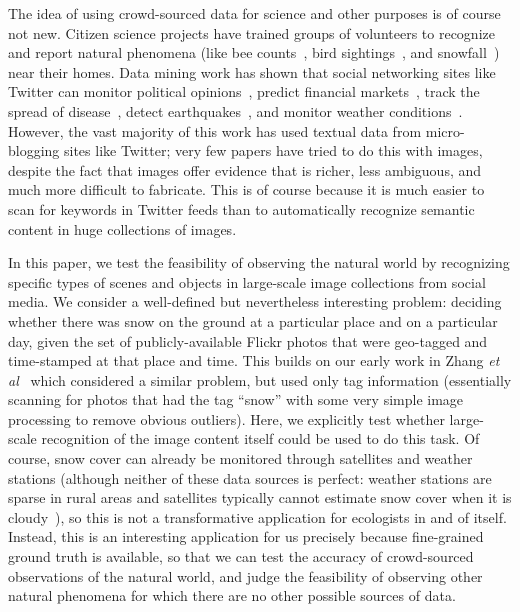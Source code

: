 The idea of using crowd-sourced data for science and other purposes is
of course not new. Citizen science projects have trained  groups
of volunteers to recognize and report natural phenomena (like bee
counts~\cite{greatsunflower}, bird sightings~\cite{ebirds}, and
snowfall~\cite{king09snowtweets}) near their homes.
Data mining work  has
shown that  social networking sites
like Twitter can 
monitor political opinions~\cite{jin10prediction,digrazia13},
predict financial markets~\cite{bollen11twitter}, track the spread of
disease~\cite{ginsberg09flu}, detect earthquakes~\cite{Sakaki:2010uv}, and monitor weather
conditions~\cite{meteo}. However, the vast majority of this work has
used textual data from micro-blogging sites like Twitter; very few papers have tried to do this with images, despite
the fact that images offer evidence that is richer, less ambiguous,
and much more difficult to fabricate. This is of course because it is
much easier to scan for keywords in Twitter feeds than to
automatically recognize semantic content in huge collections of
images. 



In this paper, we test the feasibility of observing the natural world
by recognizing specific types of scenes and objects in large-scale
image collections from social media.  We consider a well-defined but
nevertheless interesting problem: deciding whether there was snow on
the ground at a particular place and on a particular day, given the
set of publicly-available Flickr photos that were geo-tagged and
time-stamped at that place and time. This builds on our early work in
Zhang \textit{et al}~\cite{ecology2012www} which considered a similar
problem, but used only tag information (essentially scanning for
photos that had the tag ``snow'' with some very simple image
processing to remove obvious outliers). Here, we explicitly test
whether large-scale recognition of the image content itself could be
used to do this task.  Of course, snow cover can already be monitored
through satellites and weather stations (although neither of these
data sources is perfect: weather stations are sparse in rural areas
and satellites typically cannot estimate snow cover when it is
cloudy~\cite{modissnow}), so this is not a transformative application
for ecologists in and of itself. Instead, this is an interesting
application for us precisely because fine-grained ground truth is
available, so that we can test the accuracy of crowd-sourced
observations of the natural world, and judge the feasibility of
observing other natural phenomena for which  there are no other possible sources of data.


